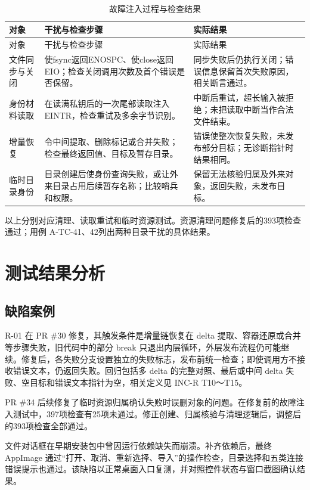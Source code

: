 \begin{longtable}{L{.21\linewidth}L{.35\linewidth}L{.35\linewidth}}
\caption{故障注入过程与检查结果}\label{tab:fault-results}\\\toprule 对象 & 干扰与检查步骤 & 实际结果\\\midrule\endfirsthead
\toprule 对象 & 干扰与检查步骤 & 实际结果\\\midrule\endhead
\bottomrule\endfoot
文件同步与关闭 & 使fsync返回ENOSPC、使close返回EIO；检查关闭调用次数及首个错误是否保留。 & 同步失败后仍执行关闭；错误信息保留首次失败原因，相关断言通过。\\
身份材料读取 & 在读满私钥后的一次尾部读取注入EINTR，检查重试及多余字节识别。 & 中断后重试，超长输入被拒绝；未把读取中断当作合法文件结束。\\
增量恢复 & 令中间提取、删除标记或合并失败；检查最终返回值、目标及暂存目录。 & 错误使整次恢复失败，未发布部分目标；无诊断指针时结果相同。\\
临时目录身份 & 目录创建后使身份查询失败，或让外来目录占用后续暂存名称；比较哨兵和权限。 & 保留无法核验归属及外来对象，返回失败，未发布目标。\\
\end{longtable}
以上分别对应清理、读取重试和临时资源测试。资源清理问题修复后的393项检查通过；用例 A-TC-41、42列出两种目录干扰的具体结果。

\section{测试结果分析}
\subsection{缺陷案例}
R-01 在 PR \#30 修复，其触发条件是增量链恢复在 delta 提取、容器还原或合并等步骤失败，旧代码中的部分 break 只退出内层循环，外层发布流程仍可能继续。修复后，各失败分支设置独立的失败标志，发布前统一检查；即使调用方不接收错误文本，仍返回失败。回归包括多 delta 的完整对照、最后或中间 delta 失败、空目标和错误文本指针为空，相关定义见 INC-R T10～T15。

PR \#34 后续修复了临时资源归属确认失败时误删对象的问题。在修复前的故障注入测试中，397项检查有25项未通过。修正创建、归属核验与清理逻辑后，调整后的393项检查全部通过。

文件对话框在早期安装包中曾因运行依赖缺失而崩溃。补齐依赖后，最终 AppImage 通过“打开、取消、重新选择、导入”的操作检查，目录选择和五类连接错误提示也通过。该缺陷以正常桌面入口复测，并对照控件状态与窗口截图确认结果。

